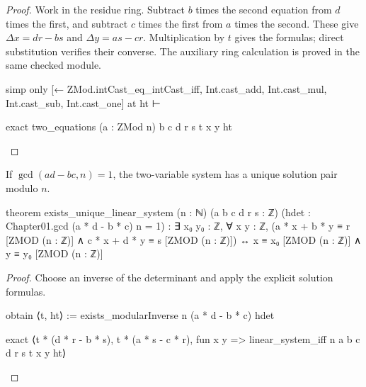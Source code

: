 \begin{proof}
  Work in the residue ring.
  Subtract $b$ times the second equation from $d$ times the first, and subtract $c$ times the first
  from $a$ times the second.
  These give $\Delta x=dr-bs$ and $\Delta y=as-cr$.
  Multiplication by $t$ gives the formulas; direct substitution verifies their converse.
  The auxiliary ring calculation is proved in the same checked module.

  \begin{lean}
    simp only [← ZMod.intCast_eq_intCast_iff, Int.cast_add, Int.cast_mul,
      Int.cast_sub, Int.cast_one] at ht ⊢

    exact two_equations (a : ZMod n) b c d r s t x y ht
  \end{lean}
\end{proof}

\begin{theorem}
  \label{ent:thm:exists-unique-linear-system}
  If $\gcd(ad-bc,n)=1$, the two-variable system has a unique solution pair modulo $n$.

  \begin{lean}
    theorem exists_unique_linear_system (n : ℕ) (a b c d r s : ℤ)
        (hdet : Chapter01.gcd (a * d - b * c) n = 1) :
        ∃ x₀ y₀ : ℤ, ∀ x y : ℤ,
          (a * x + b * y ≡ r [ZMOD (n : ℤ)] ∧ c * x + d * y ≡ s [ZMOD (n : ℤ)]) ↔
            x ≡ x₀ [ZMOD (n : ℤ)] ∧ y ≡ y₀ [ZMOD (n : ℤ)]
  \end{lean}
\end{theorem}

\begin{proof}
  Choose an inverse of the determinant and apply the explicit solution formulas.

  \begin{lean}
    obtain ⟨t, ht⟩ := exists_modularInverse n (a * d - b * c) hdet

    exact ⟨t * (d * r - b * s), t * (a * s - c * r),
      fun x y => linear_system_iff n a b c d r s t x y ht⟩
  \end{lean}
\end{proof}
